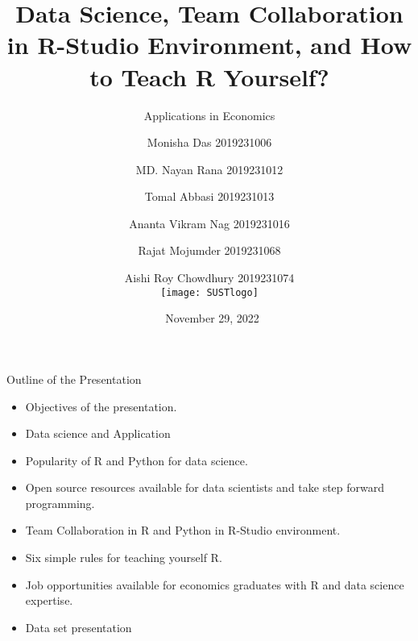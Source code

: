 \documentclass{beamer}
\title[ECO247 Presentation]{ Data Science, Team Collaboration in R-Studio Environment, and  How to Teach R Yourself?}
\subtitle{Applications in Economics}
\author[Group Four:Identity Imbalance]{\tiny Monisha Das \tiny 2019231006 \and
	MD. Nayan Rana \tiny 2019231012 \and
	Tomal Abbasi \tiny 2019231013 \and
	Ananta Vikram Nag \tiny 2019231016 \and
	Rajat Mojumder \tiny 2019231068 \and
	Aishi Roy Chowdhury \tiny 2019231074  \\ [5mm]
	\texttt{[image: SUSTlogo]}}
\institute[Economics, SUST]{\large Department of Economics, \\Shahjalal University of Science and Technology, Bangladesh}
\date[\tiny]{\ November 29, 2022}
\begin{document}
	
	\begin{frame}
		\maketitle
	\end{frame}
	
	
	\begin{frame}[t] {Outline of the Presentation}
		\begin{itemize}
			\item Objectives of the presentation.
			\item Data science and Application
			\item Popularity of R and Python for data science.
			\item Open source resources available for data scientists and take step forward programming.
			\item Team Collaboration in R and Python in R-Studio environment.
			\item Six simple rules for teaching yourself R.
			\item Job opportunities available for economics graduates with R and data science expertise.
			\item Data set presentation 
		\end{itemize}
		
	\end{frame}
	
	
\end{document}
